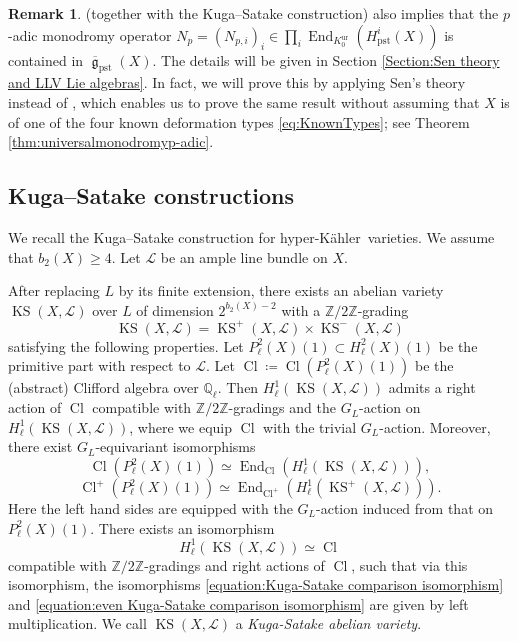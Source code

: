 \documentclass[12pt,reqno]{amsart}
\theoremstyle{definition}
\newtheorem{rem}[thm]{Remark}
\newcommand{\Q}{{\mathds Q}}
\newcommand{\Z}{{\mathds Z}}
\newcommand\End{\mathop{\mathrm{End}}\nolimits}
\newcommand\Cl{\mathop{\mathrm{Cl}}\nolimits}
\renewcommand\ge{\mathop{\mathfrak{g}}\nolimits}
\newcommand\KS{\mathop{\mathrm{KS}}\nolimits}
\newcommand{\hk}{hyper-Kähler~}
\newcommand{\scrL}{\mathscr{L}}
\DeclareMathOperator{\pst}{pst}
\DeclareMathOperator{\ur}{ur}
\numberwithin{equation}{section}
\begin{document}
\begin{rem}\label{Remark:p-adic monodromy operator in LLV will be proved later in general}
     (together with the Kuga--Satake construction) also implies that the $p$-adic monodromy operator
$N_p=(N_{p,i})_i \in \prod_i \End_{K^{\ur}_0}(H^i_{\pst}(X))$
is contained in $\overline{\ge}_{\pst}(X)$.
The details will be given in Section \ref{Section:Sen theory and LLV Lie algebras}.
In fact, we will prove this by applying Sen's theory instead of ,
which enables us to prove the same result without assuming that $X$ is of one of the four known deformation types \eqref{eq:KnownTypes}; see Theorem \ref{thm:universalmonodromyp-adic}.
\end{rem}

\subsection{Kuga--Satake constructions}\label{subsection:KugaSatakeconstruction}

We recall the Kuga--Satake construction for \hk varieties.
We assume that $b_2(X)\geq 4$.
Let $\scrL$ be an ample line bundle on $X$.

After replacing $L$ by its finite extension,
there exists
an abelian variety
$\KS(X,\scrL)$
over $L$
of dimension $2^{b_2(X)-2}$
with a $\Z/2\Z$-grading 
\[
\KS(X,\scrL)=\KS^+(X,\scrL) \times \KS^-(X,\scrL)
\]
satisfying the following properties.
Let
$
P^2_\ell (X)(1) \subset H^2_\ell(X)(1)
$
be the primitive part with respect to $\scrL$.
Let 
$\Cl \coloneqq \Cl (P^2_\ell (X)(1))$
be the (abstract) Clifford algebra over $\Q_\ell$.
Then $H^1_\ell(\KS(X,\scrL))$ admits a right action of $\Cl$ compatible with $\Z/2\Z$-gradings
and
the $G_L$-action on $H^1_\ell(\KS(X,\scrL))$, where we equip $\Cl$ with the trivial $G_L$-action.
Moreover, there exist $G_L$-equivariant isomorphisms
    \begin{equation}\label{equation:Kuga-Satake comparison isomorphism}
        \Cl  (P^2_{\ell} (X)(1))   \simeq \End_{\Cl} (H^1_{\ell} (\KS(X,\scrL))),
    \end{equation}
    \begin{equation}\label{equation:even Kuga-Satake comparison isomorphism}
        \Cl^+ (P^2_{\ell} (X)(1))   \simeq \End_{\Cl^+} (H^1_{\ell} (\KS^+(X,\scrL))).
    \end{equation}
Here the left hand sides are equipped with the $G_L$-action induced from that on $P^2_{\ell} (X)(1)$.
There exists an isomorphism
\begin{equation}\label{equation:Kuga-Satake trivialization}
    H^1_{\ell} (\KS(X,\scrL)) \simeq \Cl
\end{equation}
    compatible with $\Z/2\Z$-gradings and right actions of $\Cl$, such that via this isomorphism,
    the isomorphisms
    \eqref{equation:Kuga-Satake comparison isomorphism} and \eqref{equation:even Kuga-Satake comparison isomorphism} are given by left multiplication.
We call $\KS(X,\scrL)$ a \textit{Kuga-Satake abelian variety}.
\end{document}
